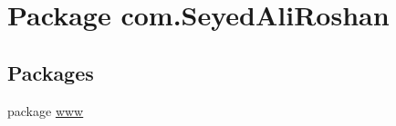 \hypertarget{namespacecom_1_1_seyed_ali_roshan}{}\section{Package com.\+Seyed\+Ali\+Roshan}
\label{namespacecom_1_1_seyed_ali_roshan}
\subsection*{Packages}
\begin{DoxyCompactItemize}
\item 
package \hyperlink{namespacecom_1_1_seyed_ali_roshan_1_1www}{www}
\end{DoxyCompactItemize}
